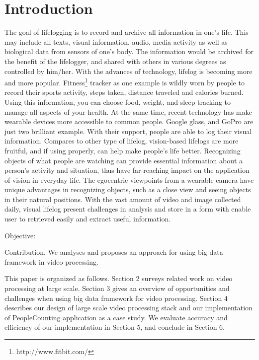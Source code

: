 \section{Introduction}
\label{sec:sec_intro}

The goal of lifelogging is to record and archive all information in one's life. 
This may include all texts, visual information, audio, media activity as well 
as biological data from sensors of one's body. The information would be archived
for the benefit of the lifelogger, and shared with others in various degrees as
controlled by him/her.  With the advances of technology, lifelog is becoming more
 and more popular. Fitness\footnote{http://www.fitbit.com/} tracker as one
 example is wildly worn by people to record  their sports activity, steps taken, distance traveled and calories
 burned.  Using this information, you can choose food, weight, and sleep
 tracking  to manage all aspects of your health.  At the same time, recent 
 technology has make wearable devices more accessible to common people. Google
 glass, and GoPro are just two brilliant example. With their support,  people
 are able to log their visual information.
Compares to other type of lifelog, vision-based lifelogs are more fruitful, and
if using properly, can help make people's life better. Recognizing objects of 
what people are watching can provide essential information about a person's 
activity and situation, thus have far-reaching impact on the application of 
vision in everyday life. The egocentric viewpoints from a wearable camera have
unique advantages in recognizing objects, such as a close view and seeing
objects in their natural positions.
With the vast amount of video and image collected daily, visual lifelog present 
challenges in analysis and store in a form with enable user to retrieved easily 
and extract useful information. 


Objective:

Contribution. We analyses and proposes an approach for using
big data framework in video processing. 

This paper is organized as follows. Section 2 surveys related work on video
processing at large scale. Section 3 gives an overview of opportunities
and challenges when using big data framework for video processing. Section 4
describes our design of large scale video processing stack and our
implementation of PeopleCounting application as a case study. We evaluate
accuracy and efficiency of our implementation in Section 5, and conclude in
Section 6.
